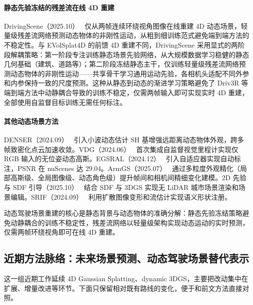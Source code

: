 \paragraph{静态先验冻结的残差流在线 4D 重建}

DrivingScene（2025.10）~\cite{2510_24734} 仅从两帧连续环绕视角图像在线重建 4D 动态场景，轻量级残差流网络预测动态物体的非刚性运动，从粗到细训练范式避免端到端方法的不稳定性。与 EVolSplat4D 的前馈 4D 重建不同，DrivingScene 采用显式的两阶段解耦策略：第一阶段专注训练静态场景先验网络，从大规模数据学习稳健的静态几何基础（建筑、道路等）；第二阶段冻结静态主干，仅训练轻量级残差流网络预测动态物体的非刚性运动——共享骨干学习通用运动先验，各相机头适配不同外参和内参保持一致的尺度预测。这种从静态到动态的渐进学习策略避免了 Driv3R 等端到端方法中动静耦合导致的训练不稳定，仅需两帧输入即可实现实时 4D 重建，全部使用自监督目标训练无需任何标注。

\paragraph{其他动态场景方法}

DENSER（2024.09）~\cite{2409_10041} 引入小波动态估计 SH 基增强远距离动态物体外观，跨多帧致密化点云加速收敛。VDG（2024.06）~\cite{2406_18198} 首次集成自监督视觉里程计实现仅 RGB 输入的无位姿动态高斯。EGSRAL（2024.12）~\cite{2412_15550} 引入自适应器实现自动标注，PSNR 在 nuScenes 达 29.04。ArmGS（2025.07）~\cite{2507_03886} 通过多粒度外观精化（局部高斯级、全局图像级、动态角色级）提升帧间和相机间精细变化建模。2D 先验与 SDF 引导（2025.10）~\cite{2510_13381} 结合 SDF 与 3DGS 实现无 LiDAR 城市场景渲染和场景编辑。SRIF（2024.09）~\cite{2409_11682} 利用扩散图像变形和流估计实现语义形状注册。

\begin{takeaway}
动态驾驶场景重建的核心是静态背景与动态物体的准确分解：静态先验冻结策略避免动静耦合的训练不稳定性，残差流网络以轻量级架构实现动态运动的实时预测，仅需两帧环绕视角即可在线 4D 重建。
\end{takeaway}


\subsection{近期方法脉络：未来场景预测、动态驾驶场景替代表示}

这一组近期工作延续 4D Gaussian Splatting、dynamic 3DGS，主要把改动集中在扩展、增量改进等环节。下面只保留相对既有路线的变化，便于和前文方法直接对照。

